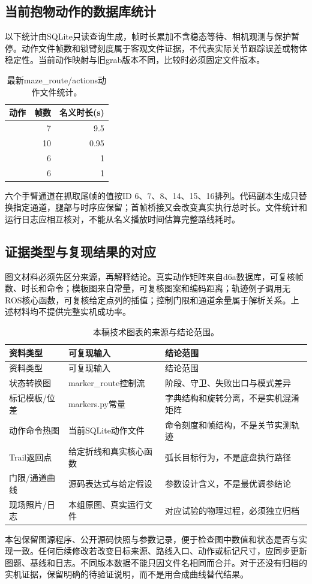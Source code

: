 \subsection{当前抱物动作的数据库统计}
以下统计由SQLite只读查询生成，帧时长累加不含稳态等待、相机观测与保护暂停。动作文件帧数和锁臂刻度属于客观文件证据，不代表实际关节跟踪误差或物体稳定性。当前动作映射与旧grab版本不同，比较时必须固定文件版本。
\begin{table}[H]\centering\small\begin{tabularx}{\linewidth}{Yrr}\toprule 动作 & 帧数 & 名义时长(s)\\\midrule
{} & 7 & 9.5\\
 & 10 & 0.95\\
 & 6 & 1\\
 & 6 & 1\\
\bottomrule\end{tabularx}\caption{最新maze\_route/actions动作文件统计。}\end{table}
六个手臂通道在抓取尾帧的值按ID 6、7、8、14、15、16排列。代码副本生成只替换指定通道，腿部与时序应保留；首帧桥接又会改变真实执行总时长。文件统计和运行日志应相互核对，不能从名义播放时间估算完整路线耗时。

\subsection{证据类型与复现结果的对应}
图文材料必须先区分来源，再解释结论。真实动作矩阵来自d6a数据库，可复核帧数、时长和命令；模板图来自常量，可复核图案和编码距离；轨迹例子调用无ROS核心函数，可复核给定点列的插值；控制门限和通道余量属于解析关系。上述材料均不提供完整实机成功率。
\begin{longtable}{p{28mm}p{46mm}p{58mm}}\caption{本稿技术图表的来源与结论范围。}\\\toprule 资料类型 & 可复现输入 & 结论范围\\\midrule\endfirsthead\toprule 资料类型 & 可复现输入 & 结论范围\\\midrule\endhead
状态转换图 & marker\_route控制流 & 阶段、守卫、失败出口与模式差异\\
标记模板/位差 & markers.py常量 & 字典结构和旋转分离，不是实机混淆矩阵\\
动作命令热图 & 当前SQLite动作文件 & 命令刻度和帧结构，不是关节实测轨迹\\
Trail返回点 & 给定折线和真实核心函数 & 弧长目标行为，不是底盘执行路径\\
门限/通道曲线 & 源码表达式与给定假设 & 参数设计含义，不是最优调参结论\\
现场照片/日志 & 本组原图、真实运行文件 & 对应试验的物理过程，必须独立归档\\\bottomrule\end{longtable}
本包保留图源程序、公开源码快照与参数记录，便于检查图中数值和状态是否与实现一致。任何后续修改若改变目标来源、路线入口、动作或标记尺寸，应同步更新图题、基线和日志。不同版本数据不能只因文件名相同而合并。对于还没有归档的实机证据，保留明确的待验证说明，而不是用合成曲线替代结果。

